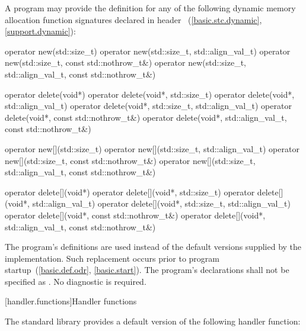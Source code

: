 \pnum
A \Cpp{} program may provide the definition for any of the following
dynamic memory allocation function signatures declared in header
~(\ref{basic.stc.dynamic}, \ref{support.dynamic}):

%
%
\begin{codeblock}
operator new(std::size_t)
operator new(std::size_t, std::align_val_t)
operator new(std::size_t, const std::nothrow_t&)
operator new(std::size_t, std::align_val_t, const std::nothrow_t&)
\end{codeblock}%
%
%
\begin{codeblock}
operator delete(void*)
operator delete(void*, std::size_t)
operator delete(void*, std::align_val_t)
operator delete(void*, std::size_t, std::align_val_t)
operator delete(void*, const std::nothrow_t&)
operator delete(void*, std::align_val_t, const std::nothrow_t&)
\end{codeblock}%
%
%
\begin{codeblock}
operator new[](std::size_t)
operator new[](std::size_t, std::align_val_t)
operator new[](std::size_t, const std::nothrow_t&)
operator new[](std::size_t, std::align_val_t, const std::nothrow_t&)
\end{codeblock}%
%
%
\begin{codeblock}
operator delete[](void*)
operator delete[](void*, std::size_t)
operator delete[](void*, std::align_val_t)
operator delete[](void*, std::size_t, std::align_val_t)
operator delete[](void*, const std::nothrow_t&)
operator delete[](void*, std::align_val_t, const std::nothrow_t&)
\end{codeblock}

\pnum
The program's definitions are used instead of the default versions supplied by
the implementation.
Such replacement occurs prior to program startup~(\ref{basic.def.odr}, \ref{basic.start}).
%
The program's declarations shall not be specified as
.
No diagnostic is required.

[handler.functions]{Handler functions}

\pnum
The \Cpp{} standard library provides a default version of the following handler
function:

